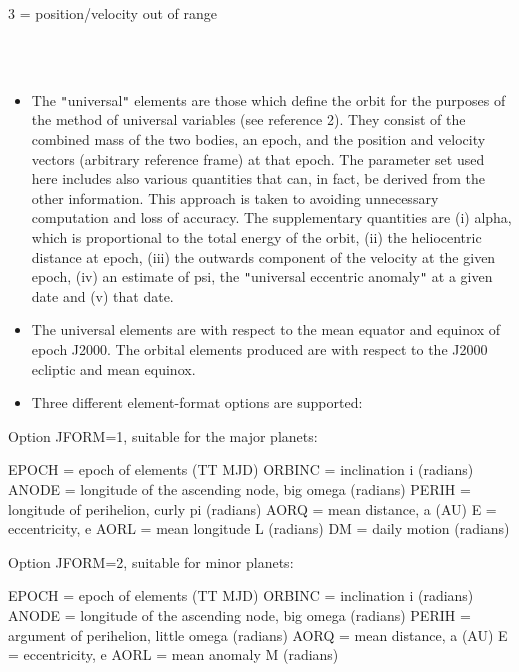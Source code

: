 \documentclass[twoside,11pt]{article}
\renewcommand{\_}{\texttt{\symbol{95}}}
\newcommand{\sstnotes}[1]{\goodbreak \item[Notes:] \mbox{} \\[1.3ex] #1}
\newcommand{\sstitemlist}[1]{
  \mbox{} \\
  \vspace{-3.5ex}
  \begin{itemize}
     #1
  \end{itemize}
}
\newcommand{\sstitem}{\item}
\newcommand{\sstnotes}[1]{\item[Notes:] #1 }
\newcommand{\sstitemlist}[1]{
      \begin{itemize}
         #1
      \end{itemize}
      \\
   }
\newcommand{\sstitem}{\item}
\begin{document}
{{{{            \sstitem
                    3 = position/velocity out of range
         }
      }
   }
   \sstnotes{
      \sstitemlist{

         \sstitem
           The {\tt "}universal{\tt "} elements are those which define the orbit for the
             purposes of the method of universal variables (see reference 2).
             They consist of the combined mass of the two bodies, an epoch,
             and the position and velocity vectors (arbitrary reference frame)
             at that epoch.  The parameter set used here includes also various
             quantities that can, in fact, be derived from the other
             information.  This approach is taken to avoiding unnecessary
             computation and loss of accuracy.  The supplementary quantities
             are (i) alpha, which is proportional to the total energy of the
             orbit, (ii) the heliocentric distance at epoch, (iii) the
             outwards component of the velocity at the given epoch, (iv) an
             estimate of psi, the {\tt "}universal eccentric anomaly{\tt "} at a given
             date and (v) that date.

         \sstitem
           The universal elements are with respect to the mean equator and
             equinox of epoch J2000.  The orbital elements produced are with
             respect to the J2000 ecliptic and mean equinox.

         \sstitem
           Three different element-format options are supported:

      }
           Option JFORM=1, suitable for the major planets:

           EPOCH  = epoch of elements (TT MJD)
           ORBINC = inclination i (radians)
           ANODE  = longitude of the ascending node, big omega (radians)
           PERIH  = longitude of perihelion, curly pi (radians)
           AORQ   = mean distance, a (AU)
           E      = eccentricity, e
           AORL   = mean longitude L (radians)
           DM     = daily motion (radians)

           Option JFORM=2, suitable for minor planets:

           EPOCH  = epoch of elements (TT MJD)
           ORBINC = inclination i (radians)
           ANODE  = longitude of the ascending node, big omega (radians)
           PERIH  = argument of perihelion, little omega (radians)
           AORQ   = mean distance, a (AU)
           E      = eccentricity, e
           AORL   = mean anomaly M (radians)

}}
\end{document}

